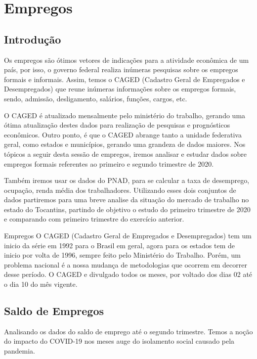 \chapter{Empregos}
\section{Introdução}
\par Os empregos são ótimos vetores de indicações para a atividade econômica de um país, por isso, o governo federal realiza inúmeras pesquisas sobre os empregos formais e informais. Assim, temos o CAGED (Cadastro Geral de Empregados e Desempregados) que reune inúmeras informações sobre os empregos formais, sendo, admissão, desligamento, salários, funções, cargos, etc.
\par O CAGED é atualizado mensalmente pelo ministério do trabalho, gerando uma ótima atualização destes dados para realização de pesquisas e prognósticos econômicos. Outro ponto, é que o CAGED abrange tanto a unidade federativa geral, como estados e municípios, gerando uma grandeza de dados maiores. Nos tópicos a seguir desta sessão de empregos, iremos analisar e estudar dados sobre empregos formais referentes ao primeiro e segundo trimestre de 2020.
\par Também iremos usar os dados do PNAD, para se calcular a taxa de desemprego, ocupação, renda média dos trabalhadores. Utilizando esses dois conjuntos de dados partiremos para uma breve analise da situação do mercado de trabalho no estado do Tocantins, partindo de objetivo o estudo do primeiro trimestre de 2020 e comparando com primeiro trimestre do exercício anterior.

\begin{smbox}[label={labelbox},nameref={Empregos}]{Empregos}
O CAGED (Cadastro Geral de Empregados e Desempregados) tem um inicio da série em 1992 para o Brasil em geral, agora para os estados tem de inicio por volta de 1996, sempre feito pelo Ministério do Trabalho. Porém, um problema nacional é a nossa mudança de metodologias que ocorrem em decorrer desse período. O CAGED e divulgado todos os meses, por voltado dos dias 02 até o dia 10 do mês vigente.
\end{smbox}

\section{Saldo de Empregos}
\par Analisando os dados do saldo de emprego até o segundo trimestre. Temos a noção do impacto do COVID-19 nos meses auge do isolamento social causado pela pandemia.

